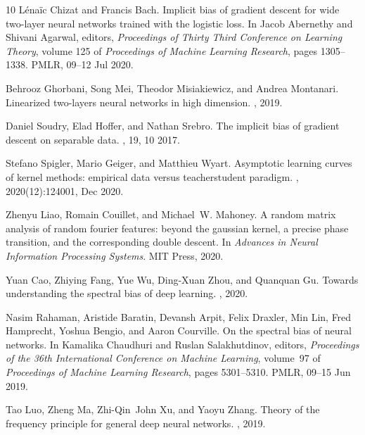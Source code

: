 \documentclass[11pt]{article}
\begin{document}
\begin{thebibliography}{10}
L\'ena\"ic Chizat and Francis Bach.
\newblock Implicit bias of gradient descent for wide two-layer neural networks
  trained with the logistic loss.
\newblock In Jacob Abernethy and Shivani Agarwal, editors, {\em Proceedings of
  Thirty Third Conference on Learning Theory}, volume 125 of {\em Proceedings
  of Machine Learning Research}, pages 1305--1338. PMLR, 09--12 Jul 2020.

Behrooz Ghorbani, Song Mei, Theodor Misiakiewicz, and Andrea Montanari.
\newblock Linearized two-layers neural networks in high dimension.
, 2019.

Daniel Soudry, Elad Hoffer, and Nathan Srebro.
\newblock The implicit bias of gradient descent on separable data.
, 19, 10 2017.

Stefano Spigler, Mario Geiger, and Matthieu Wyart.
\newblock Asymptotic learning curves of kernel methods: empirical data versus
  teacher{\textendash}student paradigm.
,
  2020(12):124001, Dec 2020.

Zhenyu Liao, Romain Couillet, and Michael~W. Mahoney.
\newblock A random matrix analysis of random fourier features: beyond the
  gaussian kernel, a precise phase transition, and the corresponding double
  descent.
\newblock In {\em Advances in Neural Information Processing Systems}. MIT
  Press, 2020.

Yuan Cao, Zhiying Fang, Yue Wu, Ding-Xuan Zhou, and Quanquan Gu.
\newblock Towards understanding the spectral bias of deep learning.
, 2020.

Nasim Rahaman, Aristide Baratin, Devansh Arpit, Felix Draxler, Min Lin, Fred
  Hamprecht, Yoshua Bengio, and Aaron Courville.
\newblock On the spectral bias of neural networks.
\newblock In Kamalika Chaudhuri and Ruslan Salakhutdinov, editors, {\em
  Proceedings of the 36th International Conference on Machine Learning},
  volume~97 of {\em Proceedings of Machine Learning Research}, pages
  5301--5310. PMLR, 09--15 Jun 2019.

Tao Luo, Zheng Ma, Zhi-Qin~John Xu, and Yaoyu Zhang.
\newblock Theory of the frequency principle for general deep neural networks.
, 2019.


\end{thebibliography}
\end{document}
